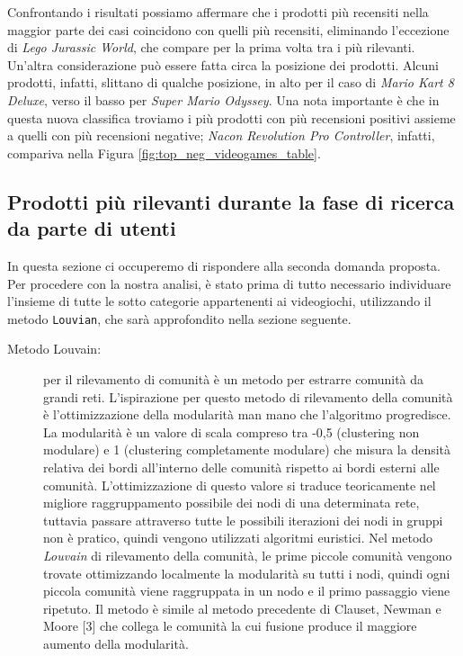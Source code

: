 			Confrontando i risultati possiamo affermare che i prodotti più recensiti nella maggior parte dei casi coincidono con quelli più recensiti, eliminando l'eccezione di \textit{Lego Jurassic World}, che compare per la prima volta tra i più rilevanti. Un'altra considerazione può essere fatta circa la posizione dei prodotti. Alcuni prodotti, infatti, slittano di qualche posizione, in alto per il caso di \textit{Mario Kart 8 Deluxe}, verso il basso per \textit{Super Mario Odyssey}. Una nota importante è che in questa nuova classifica troviamo i più prodotti con più recensioni positivi assieme a quelli con più recensioni negative; \textit{Nacon Revolution Pro Controller}, infatti, compariva nella Figura \ref{fig:top_neg_videogames_table}. 
		
		\subsection{Prodotti più rilevanti durante la fase di ricerca da parte di utenti}
		\label{cap:rilevantProducts}
			In questa sezione ci occuperemo di rispondere alla seconda domanda proposta. Per procedere con la nostra analisi, è stato prima di tutto necessario individuare l'insieme di tutte le sotto categorie appartenenti ai videogiochi, utilizzando il metodo \verb|Louvian|, che sarà approfondito nella sezione seguente.
		
			\begin{description}
				\item [Metodo Louvain:] per il rilevamento di comunità è un metodo per estrarre comunità da grandi reti. L'ispirazione per questo metodo di rilevamento della comunità è l'ottimizzazione della modularità man mano che l'algoritmo progredisce. La modularità è un valore di scala compreso tra -0,5 (clustering non modulare) e 1 (clustering completamente modulare) che misura la densità relativa dei bordi all'interno delle comunità rispetto ai bordi esterni alle comunità. L'ottimizzazione di questo valore si traduce teoricamente nel migliore raggruppamento possibile dei nodi di una determinata rete, tuttavia passare attraverso tutte le possibili iterazioni dei nodi in gruppi non è pratico, quindi vengono utilizzati algoritmi euristici. Nel metodo \textit{Louvain} di rilevamento della comunità, le prime piccole comunità vengono trovate ottimizzando localmente la modularità su tutti i nodi, quindi ogni piccola comunità viene raggruppata in un nodo e il primo passaggio viene ripetuto. Il metodo è simile al metodo precedente di Clauset, Newman e Moore [3] che collega le comunità la cui fusione produce il maggiore aumento della modularità.
			\end{description}

